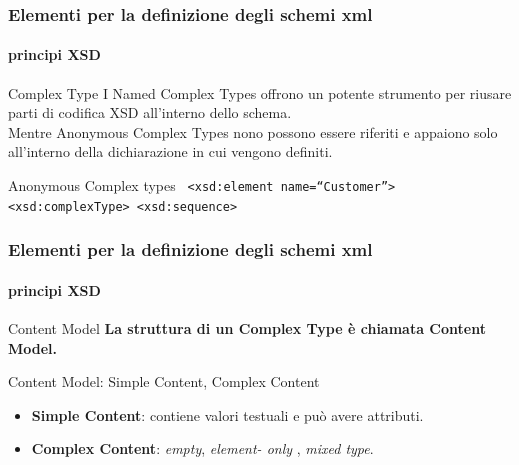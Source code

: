 \begin{frame}
	\frametitle{Elementi per la definizione degli schemi xml}
	\framesubtitle{principi XSD}
	\addtocounter{nframe}{1}

	\begin{block}{Complex Type}
		I 
		Named Complex Types offrono un potente strumento per riusare parti di codifica XSD all'interno dello schema.
		\\ Mentre Anonymous Complex Types nono possono essere riferiti e appaiono solo all'interno della dichiarazione in cui vengono definiti.

	\end{block}

	\begin{block}{Anonymous Complex types}
		\texttt{
			<xsd:element name=``Customer''>
			<xsd:complexType>
			<xsd:sequence>
		}
	\end{block}
\end{frame}


\begin{frame}
	\frametitle{Elementi per la definizione degli schemi xml}
	\framesubtitle{principi XSD}
	\addtocounter{nframe}{1}

	\begin{block}{Content Model}
		\textbf{La struttura di un Complex Type è chiamata Content Model.}
	\end{block}

	\begin{block}{Content Model: Simple Content, Complex Content}
		\begin{itemize}
			\item \textbf{Simple Content}: contiene valori testuali e può avere attributi.
			\item \textbf{Complex Content}: \textit{empty}, \textit{element- only }, \textit{mixed type}.
		\end{itemize}
	\end{block}
\end{frame}

